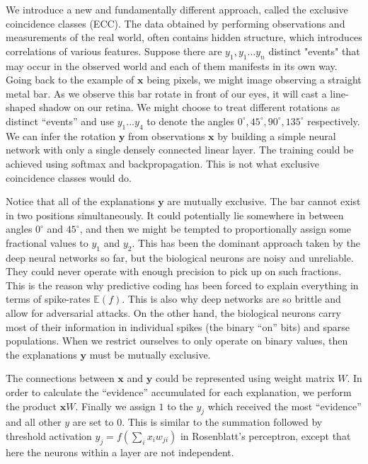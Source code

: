 \documentclass[12pt]{article}
\begin{document}
We introduce a new and fundamentally different approach, called the exclusive coincidence classes (ECC). The data obtained by performing observations and measurements of the real world, often contains hidden structure, which introduces correlations of various features. Suppose there are $y_1,y_1...y_n$ distinct "events"
that may occur in the observed world and each of them manifests in its own way.
Going back to the example of $\boldsymbol{x}$ being pixels, we might image observing a straight metal bar. As we observe this bar rotate in front of our eyes, it will cast a line-shaped shadow on our retina. We might choose to treat different  rotations as distinct ``events'' and use $y_1...y_4$ to denote the angles $0^{\circ},45^{\circ},90^{\circ},135^{\circ}$ respectively. We can infer the rotation $\boldsymbol{y}$ from observations $\boldsymbol{x}$ by building a simple neural network with only a single densely connected linear layer. The training could be achieved using softmax and backpropagation. This is not what exclusive coincidence classes would do. 

Notice that all of the explanations $\boldsymbol{y}$ are mutually exclusive.
The bar cannot exist in two positions simultaneously. It could potentially lie somewhere in between angles $0^{\circ}$ and $45^{\circ}$, and then we might be tempted to proportionally assign some fractional values to $y_1$ and $y_2$. This  has been the dominant approach taken by the deep neural networks so far, but the biological neurons are noisy and unreliable. They could never operate with enough precision to pick up on such fractions. This is the reason why predictive coding has been forced to explain everything in terms of spike-rates $\mathbb{E}(f)$. This is also why deep networks are so brittle and allow for adversarial attacks. On the other hand, the biological neurons carry most of their information in individual spikes (the binary ``on'' bits) and sparse populations. When we restrict ourselves to only operate on binary values, then the explanations $\boldsymbol{y}$ must be mutually exclusive.

The connections between $\boldsymbol{x}$ and $\boldsymbol{y}$ could be represented using weight matrix $W$. In order to calculate the ``evidence'' accumulated for each explanation, we perform the product $\boldsymbol{x}W$.
Finally we assign $1$ to the $y_j$ which received the most ``evidence'' and all other $y$ are set to $0$. This is similar to the summation followed by threshold activation $y_j=f(\sum_{i}x_{i}w_{ji})$ in Rosenblatt's perceptron, except that here the neurons within a layer are not independent.
\end{document}
